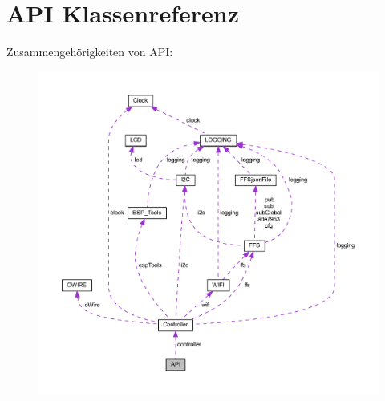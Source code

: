 \hypertarget{class_a_p_i}{}\section{A\+PI Klassenreferenz}
\label{class_a_p_i}


Zusammengehörigkeiten von A\+PI\+:
\nopagebreak
\begin{figure}[H]
\begin{center}
\leavevmode
\includegraphics[width=350pt]{class_a_p_i__coll__graph}
\end{center}
\end{figure}
